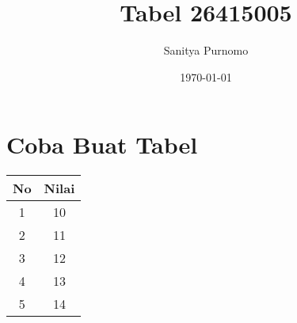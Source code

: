 \documentclass[12pt]{article}
\title{Tabel 26415005}
\author{Sanitya Purnomo}
\date{\today}
\begin{document}
 
\maketitle
 
\section{Coba Buat Tabel}

\begin{flushleft}
 \begin{tabular}{| c | c |} 
 \hline
 No & Nilai\\ [0.5ex] 
 \hline
 1 & 10 \\ 
 2 & 11 \\
 3 & 12 \\
 4 & 13 \\
 5 & 14 \\ [1ex] 
 \hline
\end{tabular}
\end{flushleft}
\end{document}
